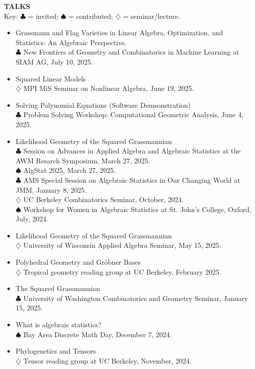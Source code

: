 \documentclass[11pt]{article}
\newcommand{\hdr}[1]{\textcolor{blue(ryb)}{\textbf{#1}}}
\begin{document}
\hdr{TALKS}\\
Key: $\clubsuit$ = invited; $\spadesuit$ = contributed; $\diamondsuit$ = seminar/lecture.
\begin{itemize}
\item Grassmann and Flag Varieties in Linear Algebra, Optimization, and Statistics: An Algebraic Perspective.\\
  $\clubsuit$ New Frontiers of Geometry and Combinatorics in Machine Learning at SIAM AG, July 10, 2025.
\item Squared Linear Models\\
  $\diamondsuit$ MPI MiS Seminar on Nonlinear Algebra, June 19, 2025.
\item Solving Polynomial Equations (Software Demsonstration)\\
  $\clubsuit$  Problem Solving Workshop: Computational Geometric Analysis, June 4, 2025.
\item Likelihood Geometry of the Squared Grassmannian\\
  $\clubsuit$ Session on Advances in Applied Algebra and Algebraic Statistics at the AWM Resarch Symposium, March 27, 2025.\\    
  $\spadesuit$ AlgStat 2025, March 27, 2025.\\  
  $\clubsuit$ AMS Special Session on Algebraic Statistics in Our Changing World at JMM, January 8, 2025.\\
  $\diamondsuit$ UC Berkeley Combinatorics Seminar, October, 2024.\\
  $\spadesuit$ Workshop for Women in Algebraic Statistics at St. John's College, Oxford, July, 2024.
\item Likelihood Geometry of the Squared Grassmannian\\
  $\diamondsuit$ University of Wisconsin Applied Algebra Seminar, May 15, 2025.
\item Polyhedral Geometry and Gr\"{o}bner Bases\\
  $\diamondsuit$ Tropical geometry reading group at UC Berkeley, February 2025. 
\item The Squared Grassmannian\\
  $\clubsuit$ University of Washington Combinatorics and Geometry Seminar, January 15, 2025.
\item What is algebraic statistics?\\
  $\spadesuit$ Bay Area Discrete Math Day, December 7, 2024. 
\item Phylogenetics and Tensors\\
  $\diamondsuit$ Tensor reading group at UC Berkeley, November, 2024. 

\end{itemize}
\end{document}

